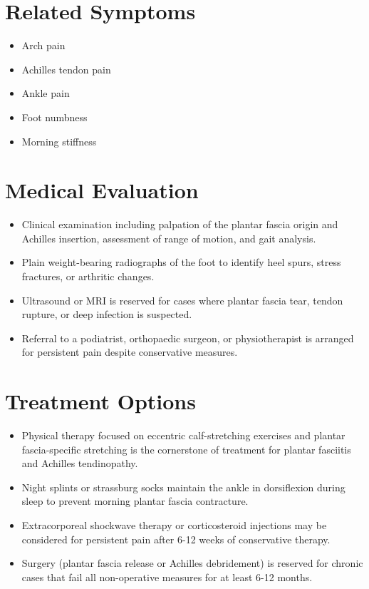 \section*{Related Symptoms}
\begin{itemize}
  \item Arch pain
  \item Achilles tendon pain
  \item Ankle pain
  \item Foot numbness
  \item Morning stiffness
\end{itemize}

\section*{Medical Evaluation}
\begin{itemize}
  \item Clinical examination including palpation of the plantar fascia origin and Achilles insertion, assessment of range of motion, and gait analysis.
  \item Plain weight-bearing radiographs of the foot to identify heel spurs, stress fractures, or arthritic changes.
  \item Ultrasound or MRI is reserved for cases where plantar fascia tear, tendon rupture, or deep infection is suspected.
  \item Referral to a podiatrist, orthopaedic surgeon, or physiotherapist is arranged for persistent pain despite conservative measures.
\end{itemize}

\section*{Treatment Options}
\begin{itemize}
  \item Physical therapy focused on eccentric calf-stretching exercises and plantar fascia-specific stretching is the cornerstone of treatment for plantar fasciitis and Achilles tendinopathy.
  \item Night splints or strassburg socks maintain the ankle in dorsiflexion during sleep to prevent morning plantar fascia contracture.
  \item Extracorporeal shockwave therapy or corticosteroid injections may be considered for persistent pain after 6-12 weeks of conservative therapy.
  \item Surgery (plantar fascia release or Achilles debridement) is reserved for chronic cases that fail all non-operative measures for at least 6-12 months.
\end{itemize}

